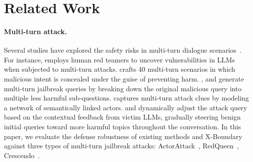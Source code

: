 \section{Related Work}

\paragraph{Multi-turn attack.}
Several studies have explored the safety risks in multi-turn dialogue scenarios~\cite{agent_multi,backdoor_multi}. 
%
For instance, \citet{scaleAI_multi} employs human red teamers to uncover vulnerabilities in LLMs when subjected to multi-turn attacks.
%
\citet{red_queen} crafts 40 multi-turn scenarios in which malicious intent is concealed under the guise of preventing harm.
%
\citet{cosafe_multi}, \citet{bju_multi} and \citet{imposterAI_multi} generate multi-turn jailbreak queries by breaking down the original malicious query into multiple less harmful sub-questions.
%
\citet{actor_attack} captures multi-turn attack clues by modeling a network of semantically linked actors. 
%
\citet{coa} and \citet{crescendo} dynamically adjust the attack query based on the contextual feedback from victim LLMs, gradually steering benign initial queries toward more harmful topics throughout the conversation.
%
In this paper, we evaluate the defense robustness of existing methods and X-Boundary against three types of multi-turn jailbreak attacks: ActorAttack~\cite{actor_attack}, RedQueen~\cite{red_queen}, Crescendo~\cite{crescendo}.

